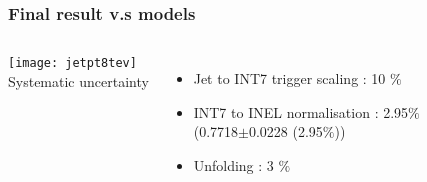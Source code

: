 \begin{frame}
\frametitle{Final result v.s models}
\begin{columns}[c]
\centering
\texttt{[image: jetpt8tev]}\\
Systematic uncertainty
\begin{itemize}
  \item{Jet to INT7 trigger scaling : 10 $\%$}
  \item{INT7 to INEL normalisation : 2.95$\%$ \\(0.7718$\pm$0.0228 (2.95$\%$))}
  \item{Unfolding : 3 $\%$ }
\end{itemize}

\end{columns}
\end{frame}


